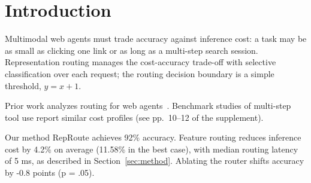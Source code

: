\newcommand{\method}{RepRoute}

\section{Introduction}\label{sec:intro}

Multimodal web agents must trade accuracy against inference cost: a task may
be as small as clicking one link or as long as a multi-step search session.
Representation routing manages the cost-accuracy trade-off with selective
classification over each request; the routing decision boundary is a simple
threshold, $y = x + 1$.

Prior work analyzes routing for web agents~\cite{wang2025routing}.
Benchmark studies of multi-step tool use report similar cost
profiles (see pp.~10--12 of the supplement).

Our method \method{} achieves 92\% accuracy. Feature routing reduces
inference cost by 4.2\% on average (11.58\% in the best case), with median
routing latency of 5 ms, as described in Section~\ref{sec:method}. Ablating
the router shifts accuracy by -0.8 points (p = .05).
